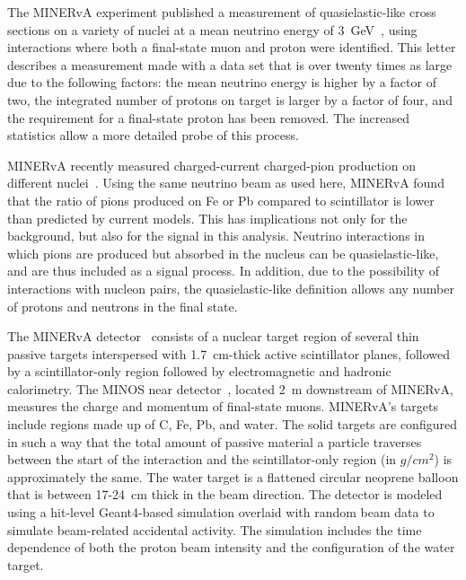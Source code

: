 \documentclass[aps,prl,twocolumn,superscriptaddress,nofootinbib]{revtex4}
\begin{document}
The MINERvA experiment published a measurement of quasielastic-like cross sections on a variety of nuclei at a mean neutrino energy of 3~GeV~\cite{Betancourt:2017uso},  
using interactions where both a final-state muon and proton were identified. This letter describes a measurement made with a data set that is over twenty times as large 
due to the following factors: the mean neutrino energy is higher by a factor of two, the integrated number of protons on target is larger by a factor of four, and the requirement for a final-state proton has been removed. 
The increased statistics allow a more detailed probe of 
this process.  

MINERvA recently measured charged-current charged-pion production on different nuclei~\cite{MINERvA:2022djk}.  Using the same neutrino beam as used here, MINERvA found that the ratio of pions produced on Fe or Pb compared to scintillator is lower than predicted by current models.  This has implications not only for the background, but also for the signal in this analysis.  Neutrino interactions in which pions are produced but absorbed in the nucleus can be quasielastic-like, and are thus included as a signal process.  In addition, due to the possibility of interactions with nucleon pairs, the quasielastic-like definition allows any number of protons and neutrons in the final state.  

The MINERvA detector~\cite{Aliaga:2013uqz} consists of a nuclear target region of several thin passive targets interspersed with 1.7~cm-thick active scintillator planes, followed by a scintillator-only region followed by electromagnetic and hadronic calorimetry.  The MINOS near detector~\cite{Michael:2008bc}, located 2~m downstream of MINERvA, measures the charge and momentum of final-state muons.  MINERvA's targets include regions made up of C, Fe, Pb, and water.  The solid targets are configured in such a way that the total amount of passive material a particle traverses between the start of the interaction and the scintillator-only region (in $g/cm^2$) is approximately the same. 
The water target is a flattened circular neoprene balloon that is between 17-24~cm thick in the beam direction.
The detector is modeled using a hit-level Geant4-based simulation overlaid with random beam data to simulate beam-related accidental activity.  The simulation includes the time dependence of both the proton beam intensity and the configuration of the water target.
\end{document}
